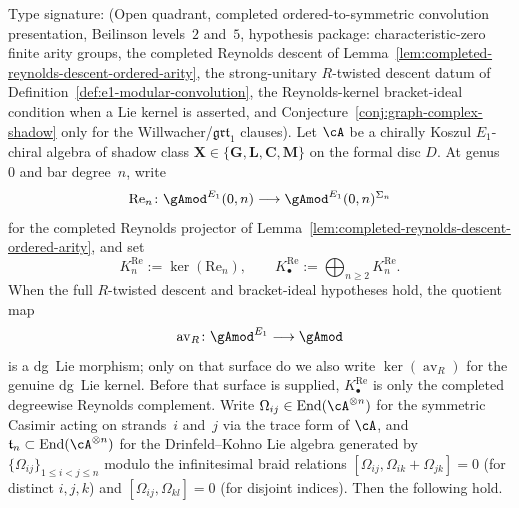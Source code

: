 \begin{theorem}
\label{thm:av-kernel-graded-lie-structure}
Type signature: \textup{(}Open quadrant, completed
ordered-to-symmetric convolution presentation, Beilinson levels~$2$
and~$5$, hypothesis package: characteristic-zero finite arity groups,
the completed Reynolds descent of
Lemma~\ref{lem:completed-reynolds-descent-ordered-arity}, the
strong-unitary $R$-twisted descent datum of
Definition~\ref{def:e1-modular-convolution}, the Reynolds-kernel
bracket-ideal condition when a Lie kernel is asserted, and
Conjecture~\ref{conj:graph-complex-shadow} only for the
Willwacher/\(\mathfrak{grt}_1\) clauses\textup{)}.
Let $\cA$ be a chirally Koszul $E_1$-chiral algebra of shadow class
$\mathbf{X}\in\{\mathbf{G},\mathbf{L},\mathbf{C},\mathbf{M}\}$ on the
formal disc $D$. At genus~$0$ and bar degree~$n$, write
\[
\mathrm{Re}_n\colon{\gAmod}^{E_1}(0,n)\longrightarrow
{\gAmod}^{E_1}(0,n)^{\Sigma_n}
\]
for the completed Reynolds projector of
Lemma~\ref{lem:completed-reynolds-descent-ordered-arity}, and set
\[
K^{\mathrm{Re}}_n:=\ker(\mathrm{Re}_n),\qquad
K^{\mathrm{Re}}_\bullet:=\bigoplus_{n\geq2}K^{\mathrm{Re}}_n.
\]
When the full $R$-twisted descent and bracket-ideal hypotheses hold,
the quotient map
\[
\operatorname{av}_R\colon{\gAmod}^{E_1}\longrightarrow\gAmod
\]
is a dg~Lie morphism; only on that surface do we also write
\(\ker(\operatorname{av}_R)\) for the genuine dg~Lie kernel. Before
that surface is supplied, \(K^{\mathrm{Re}}_\bullet\) is only the
completed degreewise Reynolds complement. Write $\Omega_{ij}\in
\operatorname{End}(\cA^{\otimes n})$ for the symmetric Casimir
acting on strands~$i$ and~$j$ via the trace form of $\cA$, and
$\mathfrak{t}_n\subset\operatorname{End}(\cA^{\otimes n})$ for the
Drinfeld--Kohno Lie algebra generated by
$\{\Omega_{ij}\}_{1\leq i<j\leq n}$ modulo the infinitesimal braid
relations $[\Omega_{ij},\Omega_{ik}+\Omega_{jk}]=0$ \textup{(}for
distinct $i,j,k$\textup{)} and $[\Omega_{ij},\Omega_{kl}]=0$
\textup{(}for disjoint indices\textup{)}. Then the following hold.


\end{theorem}

